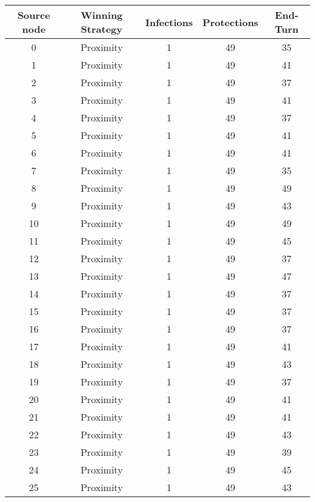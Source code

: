 \documentclass[results.tex]{subfiles}
\begin{document}
\begin{center}
  \begin{tabular}{| c || c | c | c | c |}
    \hline
    {\bfseries Source node} & {\bfseries Winning Strategy} & {\bfseries Infections} & {\bfseries Protections} & {\bfseries End-Turn} \\  %
    \hline\hline
    0 & Proximity & 1 & 49 & 35 \\ 
    \hline
    1 & Proximity & 1 & 49 & 41 \\ 
    \hline
    2 & Proximity & 1 & 49 & 37 \\ 
    \hline
    3 & Proximity & 1 & 49 & 41 \\ 
    \hline
    4 & Proximity & 1 & 49 & 37 \\ 
    \hline
    5 & Proximity & 1 & 49 & 41 \\ 
    \hline
    6 & Proximity & 1 & 49 & 41 \\ 
    \hline
    7 & Proximity & 1 & 49 & 35 \\ 
    \hline
    8 & Proximity & 1 & 49 & 49 \\ 
    \hline
    9 & Proximity & 1 & 49 & 43 \\ 
    \hline
    10 & Proximity & 1 & 49 & 49 \\ 
    \hline
    11 & Proximity & 1 & 49 & 45 \\ 
    \hline
    12 & Proximity & 1 & 49 & 37 \\ 
    \hline
    13 & Proximity & 1 & 49 & 47 \\ 
    \hline
    14 & Proximity & 1 & 49 & 37 \\ 
    \hline
    15 & Proximity & 1 & 49 & 37 \\ 
    \hline
    16 & Proximity & 1 & 49 & 37 \\ 
    \hline
    17 & Proximity & 1 & 49 & 41 \\ 
    \hline
    18 & Proximity & 1 & 49 & 43 \\ 
    \hline
    19 & Proximity & 1 & 49 & 37 \\ 
    \hline
    20 & Proximity & 1 & 49 & 41 \\ 
    \hline
    21 & Proximity & 1 & 49 & 41 \\ 
    \hline
    22 & Proximity & 1 & 49 & 43 \\ 
    \hline
    23 & Proximity & 1 & 49 & 39 \\ 
    \hline
    24 & Proximity & 1 & 49 & 45 \\ 
    \hline
    25 & Proximity & 1 & 49 & 43 \\ 

\end{tabular}
\end{center}
\end{document}
